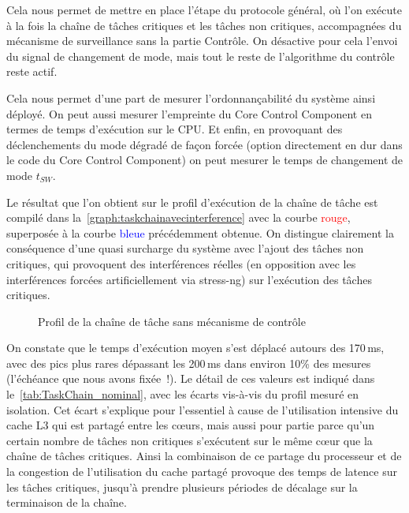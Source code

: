 \documentclass[french, a4paper, 11pt, twoside, pdftex]{StyleThese}
\begin{document}
Cela nous permet de mettre en place l'étape  du protocole général, où l'on exécute à la fois la chaîne de tâches critiques et les tâches non critiques, accompagnées du mécanisme de surveillance sans la partie Contrôle. On désactive pour cela l'envoi du signal de changement de mode, mais tout le reste de l'algorithme du contrôle reste actif.

Cela nous permet d'une part de mesurer l'ordonnançabilité du système ainsi déployé. On peut aussi mesurer l'empreinte du Core Control Component en termes de temps d'exécution sur le CPU. Et enfin, en provoquant des déclenchements du mode dégradé de façon forcée (option directement en dur dans le code du Core Control Component) on peut mesurer le temps de changement de mode $t_{SW}$.

Le résultat que l'on obtient sur le profil d'exécution de la chaîne de tâche est compilé dans la~\autoref{graph:taskchainavecinterference} avec la courbe \textcolor{red}{rouge}, superposée à la courbe \textcolor{blue}{bleue} précédemment obtenue. On distingue clairement la conséquence d'une quasi surcharge du système avec l'ajout des tâches non critiques, qui provoquent des interférences réelles (en opposition avec les interférences forcées artificiellement via stress-ng) sur l'exécution des tâches critiques. %

\begin{figure}[ht]
	\centering
	\scalebox{0.9}{}
   	\captionsetup{justification=centering}
	\caption{Profil de la chaîne de tâche sans mécanisme de contrôle}
	\label{graph:taskchainavecinterference}
\end{figure}

 On constate que le temps d'exécution moyen s'est déplacé autours des 170\,ms, avec des pics plus rares dépassant les 200\,ms dans environ 10\% des mesures (l'échéance que nous avons fixée~!). Le détail de ces valeurs est indiqué dans le~\autoref{tab:TaskChain_nominal}, avec les écarts vis-à-vis du profil mesuré en isolation. Cet écart s'explique pour l'essentiel à cause de l'utilisation intensive du cache L3 qui est partagé entre les cœurs, mais aussi pour partie parce qu'un certain nombre de tâches non critiques s'exécutent sur le même cœur que la chaîne de tâches critiques. Ainsi la combinaison de ce partage du processeur et de la congestion de l'utilisation du cache partagé provoque des temps de latence sur les tâches critiques, jusqu'à prendre plusieurs périodes de décalage sur la terminaison de la chaîne.
 
\end{document}
